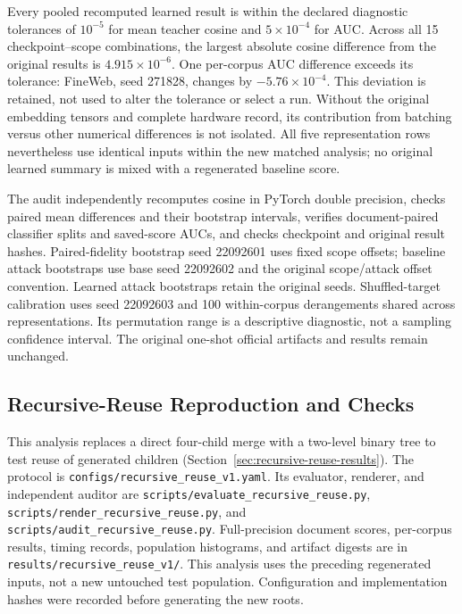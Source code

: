 \documentclass[10pt]{article}
\begin{document}
Every pooled recomputed learned result is within the declared diagnostic
tolerances of \(10^{-5}\) for mean teacher cosine and \(5\times10^{-4}\) for
AUC. Across all 15 checkpoint--scope combinations, the largest absolute cosine
difference from the original results is \(4.915\times10^{-6}\). One per-corpus
AUC difference exceeds its tolerance: FineWeb, seed 271828, changes by
\(-5.76\times10^{-4}\). This deviation is retained, not used to alter the
tolerance or select a run. Without the original embedding tensors and complete
hardware record, its contribution from batching versus other numerical
differences is not isolated. All five representation rows nevertheless use
identical inputs within the new matched analysis; no original learned summary
is mixed with a regenerated baseline score.

The audit independently recomputes cosine in PyTorch double precision, checks
paired mean differences and their bootstrap intervals, verifies document-paired
classifier splits and saved-score AUCs, and checks checkpoint and original
result hashes. Paired-fidelity bootstrap seed 22092601 uses fixed scope offsets;
baseline attack bootstraps use base seed 22092602 and the original scope/attack
offset convention. Learned attack bootstraps retain the original seeds.
Shuffled-target calibration uses seed 22092603 and 100 within-corpus
derangements shared across representations. Its permutation range is a
descriptive diagnostic, not a sampling confidence interval. The original
one-shot official artifacts and results remain unchanged.

\subsection{Recursive-Reuse Reproduction and Checks}
\label{app:recursive-reuse}

This analysis replaces a direct four-child merge with a two-level binary tree
to test reuse of generated children (Section~\ref{sec:recursive-reuse-results}).
The protocol is \nolinkurl{configs/recursive_reuse_v1.yaml}. Its evaluator,
renderer, and independent auditor are
\nolinkurl{scripts/evaluate_recursive_reuse.py},
\nolinkurl{scripts/render_recursive_reuse.py}, and
\nolinkurl{scripts/audit_recursive_reuse.py}. Full-precision document scores,
per-corpus results, timing records, population histograms, and artifact digests
are in \nolinkurl{results/recursive_reuse_v1/}. This analysis uses the preceding
regenerated inputs, not a new untouched test population. Configuration and
implementation hashes were recorded before generating the new roots.
\end{document}
